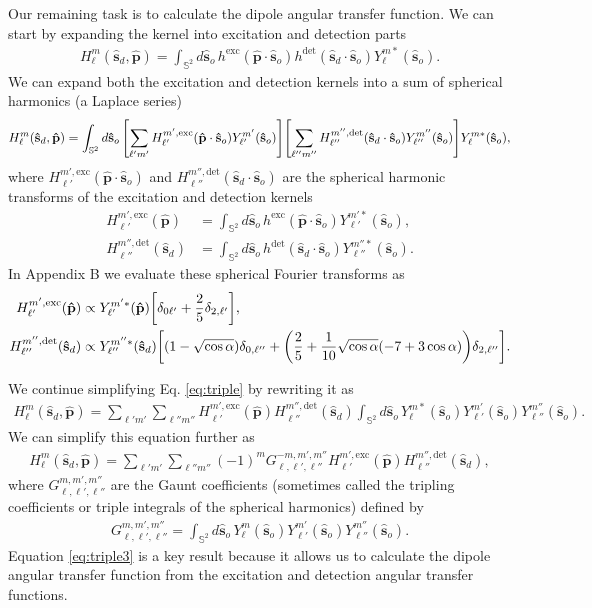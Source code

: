 \documentclass[11pt]{article}
\providecommand{\so}{\mathbf{\hat{s}}_o}
\providecommand{\sd}{\mathbf{\hat{s}}_d}
\providecommand{\pp}{\mathbf{\hat{p}}}
\providecommand{\mbb}[1]{\mathbb{#1}}
\providecommand{\ints}[1]{\int_{\mbb{S}^{#1}}}
\let\originalleft\left
\let\originalright\right
\renewcommand{\left}{\mathopen{}\mathclose\bgroup\originalleft}
\renewcommand{\right}{\aftergroup\egroup\originalright}
\begin{document}
Our remaining task is to calculate the dipole angular transfer function. We can
start by expanding the kernel into excitation and detection parts
\begin{align}
  H_\ell^m(\sd, \pp) = \ints{2}d\so\, h^{\text{exc}}(\pp\cdot\so)h^{\text{det}}(\sd\cdot\so)Y_\ell^{m*}(\so). 
\end{align}
We can expand both the excitation and detection kernels into a sum of spherical harmonics (a Laplace series)
\begin{align}
    H_\ell^m(\sd, \pp) = \ints{2}d\so\, \left[\sum_{\ell' m'}H_{\ell'}^{m',\text{exc}}(\pp\cdot\so)Y_{\ell'}^{m'}(\so)\right]\left[\sum_{\ell'' m''}H_{\ell''}^{m'',\text{det}}(\sd\cdot\so)Y_{\ell''}^{m''}(\so)\right]Y_\ell^{m*}(\so),\label{eq:triple}
\end{align}
where $H_{\ell'}^{m',\text{exc}}(\pp\cdot\so)$ and $H_{\ell''}^{m'',\text{det}}(\sd\cdot\so)$ are the spherical harmonic transforms of the excitation and detection kernels
\begin{align}
  H_{\ell'}^{m',\text{exc}}(\pp) &= \ints{2}d\so\, h^{\text{exc}}(\pp\cdot\so)Y_{\ell'}^{m'*}(\so),\label{eq:sh1}\\
  H_{\ell''}^{m'',\text{det}}(\sd) &= \ints{2}d\so\, h^{\text{det}}(\sd\cdot\so)Y_{\ell''}^{m''*}(\so)\label{eq:sh2}.
\end{align}
In Appendix B we evaluate these spherical Fourier transforms as
\begin{align}
    H_{\ell'}^{m',\text{exc}}(\pp) &\propto Y_{\ell'}^{m'*}(\pp)\left[\delta_{0\ell'} + \frac{2}{5}\delta_{2,\ell'}\right],\label{eq:dipexc}\\
    H_{\ell''}^{m'',\text{det}}(\sd) &\propto Y_{\ell''}^{m''*}(\sd)\left[(1 - \sqrt{\cos\alpha})\delta_{0,\ell''} + \left(\frac{2}{5} + \frac{1}{10}\sqrt{\cos\alpha}(-7+3\cos\alpha)\right)\delta_{2,\ell''}\right].\label{eq:dipdet}
\end{align}

We continue simplifying Eq. \eqref{eq:triple} by rewriting it as
\begin{align}
    H_\ell^m(\sd, \pp) = \sum_{\ell' m'}\sum_{\ell'' m''}H_{\ell'}^{m',\text{exc}}(\pp)H_{\ell''}^{m'',\text{det}}(\sd)\ints{2}d\so\, Y_\ell^{m*}(\so)Y_{\ell'}^{m'}(\so)Y_{\ell''}^{m''}(\so).\label{eq:triple2}
\end{align}
We can simplify this equation further as
\begin{align}
    H_\ell^m(\sd, \pp) = \sum_{\ell' m'}\sum_{\ell'' m''}(-1)^m G_{\ell,\ell',\ell''}^{-m,m',m''}H_{\ell'}^{m',\text{exc}}(\pp)H_{\ell''}^{m'',\text{det}}(\sd),\label{eq:triple3}
\end{align}
where $G_{\ell,\ell',\ell''}^{m,m',m''}$ are the Gaunt coefficients (sometimes
called the tripling coefficients or triple integrals of the spherical harmonics)
defined by
\begin{align}
  G_{\ell,\ell',\ell''}^{m,m',m''} = \ints{2}d\so\, Y_\ell^{m}(\so)Y_{\ell'}^{m'}(\so)Y_{\ell''}^{m''}(\so).
\end{align}
Equation \eqref{eq:triple3} is a key result because it allows us to calculate
the dipole angular transfer function from the excitation and detection angular
transfer functions.
\end{document}
